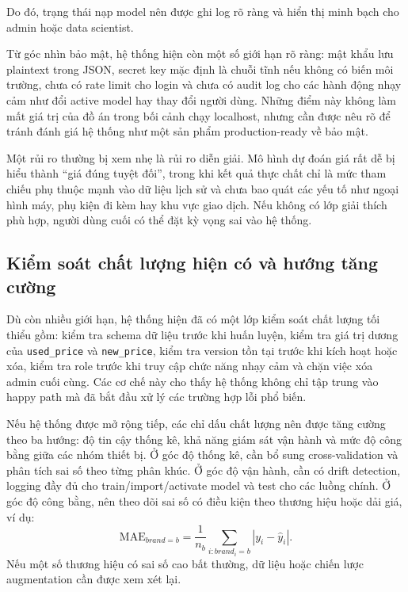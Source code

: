 Do đó, trạng thái nạp model nên được ghi log rõ ràng và hiển thị minh bạch cho admin hoặc data scientist.


Từ góc nhìn bảo mật, hệ thống hiện còn một số giới hạn rõ ràng: mật khẩu lưu plaintext trong JSON, secret key mặc định là chuỗi tĩnh nếu không có biến môi trường, chưa có rate limit cho login và chưa có audit log cho các hành động nhạy cảm như đổi active model hay thay đổi người dùng. Những điểm này không làm mất giá trị của đồ án trong bối cảnh chạy localhost, nhưng cần được nêu rõ để tránh đánh giá hệ thống như một sản phẩm production-ready về bảo mật.


Một rủi ro thường bị xem nhẹ là rủi ro diễn giải. Mô hình dự đoán giá rất dễ bị hiểu thành ``giá đúng tuyệt đối'', trong khi kết quả thực chất chỉ là mức tham chiếu phụ thuộc mạnh vào dữ liệu lịch sử và chưa bao quát các yếu tố như ngoại hình máy, phụ kiện đi kèm hay khu vực giao dịch. Nếu không có lớp giải thích phù hợp, người dùng cuối có thể đặt kỳ vọng sai vào hệ thống.

\subsection{Kiểm soát chất lượng hiện có và hướng tăng cường}


Dù còn nhiều giới hạn, hệ thống hiện đã có một lớp kiểm soát chất lượng tối thiểu gồm: kiểm tra schema dữ liệu trước khi huấn luyện, kiểm tra giá trị dương của \texttt{used\_price} và \texttt{new\_price}, kiểm tra version tồn tại trước khi kích hoạt hoặc xóa, kiểm tra role trước khi truy cập chức năng nhạy cảm và chặn việc xóa admin cuối cùng. Các cơ chế này cho thấy hệ thống không chỉ tập trung vào happy path mà đã bắt đầu xử lý các trường hợp lỗi phổ biến.


Nếu hệ thống được mở rộng tiếp, các chỉ dấu chất lượng nên được tăng cường theo ba hướng: độ tin cậy thống kê, khả năng giám sát vận hành và mức độ công bằng giữa các nhóm thiết bị. Ở góc độ thống kê, cần bổ sung cross-validation và phân tích sai số theo từng phân khúc. Ở góc độ vận hành, cần có drift detection, logging đầy đủ cho train/import/activate model và test cho các luồng chính. Ở góc độ công bằng, nên theo dõi sai số có điều kiện theo thương hiệu hoặc dải giá, ví dụ:
$$
\mathrm{MAE}_{brand=b} = \frac{1}{n_b}\sum_{i: brand_i=b}|y_i - \hat{y}_i|.
$$
Nếu một số thương hiệu có sai số cao bất thường, dữ liệu hoặc chiến lược augmentation cần được xem xét lại.
